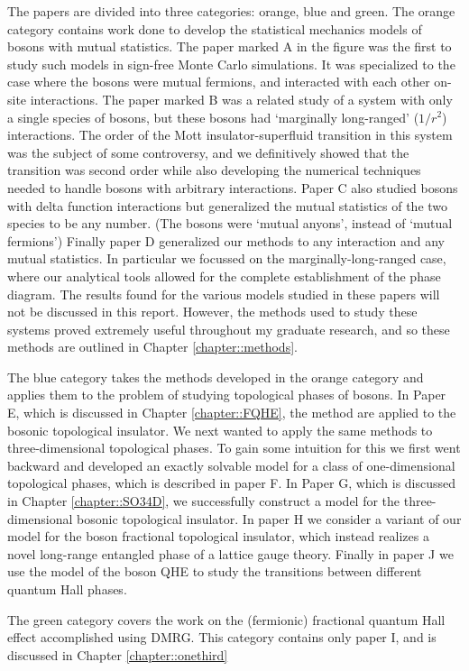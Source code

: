 The papers are divided into three categories: orange, blue and green. The orange category contains work done to develop the statistical mechanics models of bosons with mutual statistics. The paper marked A in the figure was the first to study such models in sign-free Monte Carlo simulations. It was specialized to the case where the bosons were mutual fermions, and interacted with each other on-site interactions. 
The paper marked B was a related study of a system with only a single species of bosons, but these bosons had `marginally long-ranged' ($1/r^2$) interactions. The order of the Mott insulator-superfluid transition in this system was the subject of some controversy, and we definitively showed that the transition was second order while also developing the numerical techniques needed to handle bosons with arbitrary interactions. 
Paper C also studied bosons with delta function interactions but generalized the mutual statistics of the two species to be any number. (The bosons were `mutual anyons', instead of `mutual fermions') 
Finally paper D generalized our methods to any interaction and any mutual statistics. In particular we focussed on the marginally-long-ranged case, where our analytical tools allowed for the complete establishment of the phase diagram. The results found for the various models studied in these papers will not be discussed in this report. However, the methods used to study these systems proved extremely useful throughout my graduate research, and so these methods are outlined in Chapter \ref{chapter::methods}.

The blue category takes the methods developed in the orange category and applies them to the problem of studying topological phases of bosons. In Paper E, which is discussed in Chapter \ref{chapter::FQHE}, the method are applied to the bosonic topological insulator. We next wanted to apply the same methods to three-dimensional topological phases. To gain some intuition for this we first went backward and developed an exactly solvable model for a class of one-dimensional topological phases, which is described in paper F. In Paper G, which is discussed in Chapter \ref{chapter::SO34D}, we successfully construct a model for the three-dimensional bosonic topological insulator. In paper H we consider a variant of our model for the boson fractional topological insulator, which instead realizes a novel long-range entangled phase of a lattice gauge theory. Finally in paper J we use the model of the boson QHE to study the transitions between different quantum Hall phases.

The green category covers the work on the (fermionic) fractional quantum Hall effect accomplished using DMRG. This category contains only paper I, and is discussed in Chapter \ref{chapter::onethird}
